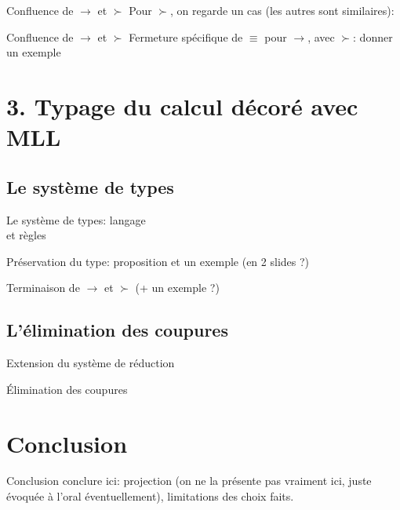 \documentclass[11pt]{beamer}
\newcommand{\dlsucc}{\rotatebox[origin=c]{45}{$\prec$}}
\newcommand{\drsucc}{\rotatebox[origin=c]{-45}{$\succ$}}
\begin{document}
\begin{frame}{Confluence de $\to$ et $\succ$}
Pour $\succ$, on regarde un cas (les autres sont similaires):
\end{frame}

\begin{frame}{Confluence de $\to$ et $\succ$}
Fermeture spécifique de $\equiv$ pour $\to$, avec $\succ$: donner un exemple %
\end{frame}

\section{3. Typage du calcul décoré avec MLL}
\subsection{Le système de types}

\begin{frame}
Le système de types: langage\\ %
et règles %
\end{frame}

\begin{frame}
Préservation du type: proposition et un exemple (en 2 slides ?) %
\end{frame}

\begin{frame}
Terminaison de $\to$ et $\succ$ (+ un exemple ?) %
\end{frame}

\subsection{L'élimination des coupures}

\begin{frame}
Extension du système de réduction %
\end{frame}

\begin{frame}
Élimination des coupures %
\end{frame}

\section{Conclusion}

\begin{frame}{Conclusion}
conclure ici: projection (on ne la présente pas vraiment ici, juste évoquée à l'oral éventuellement), limitations des choix faits.
\end{frame}
\end{document}
